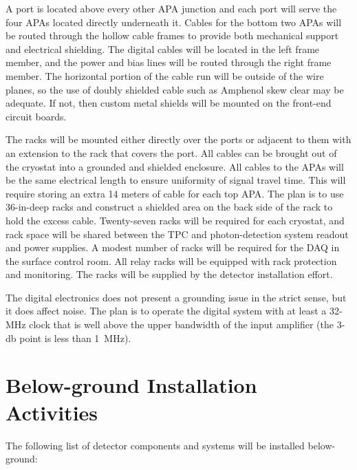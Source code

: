A port is located above every other APA junction and each port will serve the four APAs located directly underneath it.  Cables for the bottom two APAs will be routed through the hollow cable frames to provide both mechanical support and electrical shielding.  The digital cables will be located in the left frame member, and the power and bias lines will be routed through the right frame member.  The horizontal portion of the cable run will be outside of the wire planes, so the use of doubly shielded cable such as Amphenol skew clear 
may be adequate.   If  not, then custom metal shields will be mounted on the front-end circuit boards.

The racks will be mounted either directly over the ports or adjacent to them with an extension to the rack that covers the port. All cables can be brought out of the cryostat into a grounded and shielded enclosure.  %
All cables to the APAs will be the same electrical length to ensure uniformity of signal travel time.  This will require storing an extra 14 meters of cable for each top  APA.  The plan is to use 36-in-deep racks and construct a shielded area on the back side of the rack to hold the excess cable.  Twenty-seven racks will be required for each cryostat, and rack space will be shared between the TPC and photon-detection system readout and power supplies. A modest number of racks will be required for the DAQ in the surface control room. All relay racks will be equipped with rack protection and monitoring. The racks will be supplied by the detector installation effort.

The digital electronics does not present a grounding issue in the strict sense, but it does affect noise.  The plan is to operate the digital system with at least a 32-MHz clock that is well above the upper bandwidth of the input amplifier (the 3-db point is less than 1~MHz).




\section{Below-ground Installation Activities}

The following list of detector components and systems %
will be installed below-ground:

